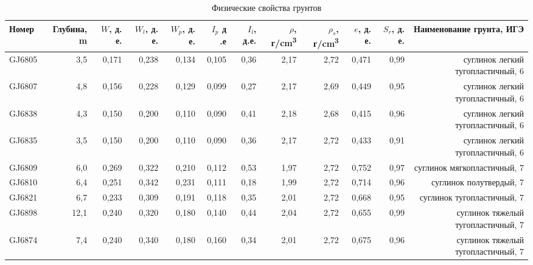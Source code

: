 \begin{landscape}
    \begin{table}[h]
      \small
      \centering
      \tiny
      \caption{Физические свойства грунтов}
      \begin{tabular}{@{}|l|r|r|r|r|r|r|r|r|r|r|r|@{}}
      \hline
      Номер  & Глубина, \si{\meter} & $W$, д. е. & $W_l$, д. е. & $W_p$, д. е. & $I_p$ д .е & $I_l$, д.е. & $\rho$, г/\si{\centi\meter^3} & $\rho_s$, г/\si{\centi\meter^3} & $e$, д. е. & $S_r$, д. е. & Наименование   грунта, ИГЭ \\ \hline
      GJ6805          & 3,5        & 0,171                        & 0,238   & 0,134  & 0,105  & 0,36     & 2,17     & 2,72      & 0,471   & 0,99     & суглинок легкий  тугопластичный, 6   \\ \hline
      GJ6807          & 4,8        & 0,156                        & 0,228   & 0,129  & 0,099  & 0,27     & 2,17     & 2,69      & 0,449   & 0,95     & суглинок легкий   тугопластичный, 6   \\ \hline
      GJ6838          & 4,3        & 0,150                        & 0,200   & 0,110  & 0,090  & 0,41     & 2,18     & 2,68      & 0,415   & 0,96     & суглинок легкий   тугопластичный, 6   \\\hline
      GJ6835          & 3,5        & 0,150                        & 0,200   & 0,110  & 0,090  & 0,36     & 2,17     & 2,72      & 0,433   & 0,91     & суглинок легкий   тугопластичный, 6   \\ \hline
      GJ6809          & 6,0        & 0,269                        & 0,322   & 0,210  & 0,112  & 0,53     & 1,97     & 2,72      & 0,752   & 0,97     & суглинок   мягкопластичный, 7   \\ \hline
      GJ6810          & 6,4        & 0,251                        & 0,342   & 0,231  & 0,111  & 0,18     & 1,99     & 2,72      & 0,714   & 0,96     & суглинок    полутвердый, 7   \\ \hline
      GJ6821          & 6,7        & 0,233                        & 0,309   & 0,191  & 0,118  & 0,35     & 2,01     & 2,72      & 0,668   & 0,95     & суглинок   тугопластичный, 7   \\ \hline
      GJ6898          & 12,1       & 0,240                        & 0,320   & 0,180  & 0,140  & 0,44     & 2,04     & 2,72      & 0,655   & 0,99     & суглинок тяжелый   тугопластичный, 7   \\ \hline
      GJ6874          & 7,4        & 0,240                        & 0,340   & 0,180  & 0,160  & 0,34     & 2,01     & 2,72      & 0,675   & 0,96     & суглинок тяжелый   тугопластичный, 7   \\ \hline

\end{tabular}
\end{table}
\end{landscape}
